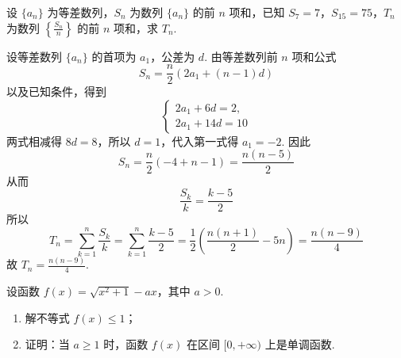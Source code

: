 \begin{problem}
设 \(\{a_{n}\}\) 为等差数列，\(S_{n}\) 为数列 \(\{a_{n}\}\) 的前 \(n\) 项和，已知 \(S_{7} = 7\)，\(S_{15} = 75\)，\(T_{n}\) 为数列 \(\left\{\frac{S_{n}}{n}\right\}\) 的前 \(n\) 项和，求 \(T_{n}\).
\end{problem}

\begin{solution}
设等差数列 \(\{a_{n}\}\) 的首项为 \(a_{1}\)，公差为 \(d\). 由等差数列前 \(n\) 项和公式
\[
S_{n}=\frac{n}{2}\left(2a_{1}+(n-1)d\right)
\]
以及已知条件，得到
\[
\begin{cases}
2a_{1}+6d=2,\\
2a_{1}+14d=10
\end{cases}
\]
两式相减得 \(8d=8\)，所以 \(d=1\)，代入第一式得 \(a_{1}=-2\). 因此
\[
S_{n}=\frac{n}{2}\left(-4+n-1\right)=\frac{n(n-5)}{2}
\]
从而
\[
\frac{S_{k}}{k}=\frac{k-5}{2}
\]
所以
\[
T_{n}=\sum_{k=1}^{n}\frac{S_{k}}{k}=\sum_{k=1}^{n}\frac{k-5}{2}=\frac{1}{2}\left(\frac{n(n+1)}{2}-5n\right)=\frac{n(n-9)}{4}
\]
故 \(T_{n}=\frac{n(n-9)}{4}\).
\end{solution}

\begin{problem}
设函数 \(f(x) = \sqrt{x^{2} + 1} - ax\)，其中 \(a > 0\).

\begin{enumerate}
\item 解不等式 \(f(x) \leqslant 1\)；
\item 证明：当 \(a \geqslant 1\) 时，函数 \(f(x)\) 在区间 \([0, +\infty)\) 上是单调函数.
\end{enumerate}
\end{problem}

